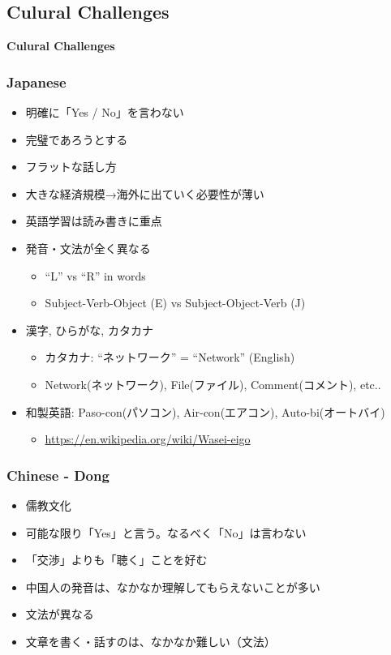 \documentclass[aspectratio=169,11pt,hyperref={colorlinks=true}]{beamer}
\begin{document}
\subsection{Culural Challenges}
\begin{frame}
  \bf\Huge{Culural Challenges}
\end{frame}

\begin{frame}
\frametitle{Japanese}
  \begin{itemize}
    \item 明確に「Yes / No」を言わない
    \item 完璧であろうとする
    \item フラットな話し方
    \item 大きな経済規模→海外に出ていく必要性が薄い
    \item 英語学習は読み書きに重点
    \item 発音・文法が全く異なる
      \begin{itemize}
      \item ``L'' vs ``R'' in words
      \item Subject-Verb-Object (E) vs Subject-Object-Verb (J)
      \end{itemize}
    \item 漢字, ひらがな, カタカナ
      \begin{itemize}
      \item カタカナ: ``ネットワーク'' = ``Network'' (English)
      \item Network(ネットワーク), File(ファイル), Comment(コメント), etc..
      \end{itemize}
    \item 和製英語: Paso-con(パソコン), Air-con(エアコン), Auto-bi(オートバイ)
      \begin{itemize}
        \item \url{https://en.wikipedia.org/wiki/Wasei-eigo}
      \end{itemize}
  \end{itemize}
\end{frame}

\begin{frame}
\frametitle{Chinese - Dong}
  \begin{itemize}
  \item 儒教文化
  \item 可能な限り「Yes」と言う。なるべく「No」は言わない
  \item 「交渉」よりも「聴く」ことを好む
  \item 中国人の発音は、なかなか理解してもらえないことが多い
  \item 文法が異なる
  \item 文章を書く・話すのは、なかなか難しい（文法）
  \end{itemize}
\end{frame}
\end{document}

